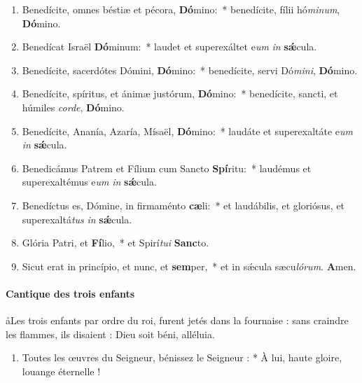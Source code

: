 \documentclass[twoside]{article}
\begin{document}
\begin{paracol}[1]{2}
\begin{enumerate}[wide, itemsep=0mm, labelwidth=!, labelindent=0pt, label=\color{gregoriocolor}\theenumi]
\item Benedícite, omnes béstiæ et pécora, \textbf{Dó}mino:~* benedícite, fílii hó\textit{mi}\textit{num}, \textbf{Dó}mino.

\item Benedícat Israël \textbf{Dó}minum:~* laudet et superexáltet e\textit{um} \textit{in} \textbf{sǽ}cula.

\item Benedícite, sacerdótes Dómini, \textbf{Dó}mino:~* benedícite, servi Dó\textit{mi}\textit{ni}, \textbf{Dó}mino.

\item Benedícite, spíritus, et ánimæ justórum, \textbf{Dó}mino:~* benedícite, sancti, et húmiles \textit{cor}\textit{de}, \textbf{Dó}mino.

\item Benedícite, Ananía, Azaría, Mísaël, \textbf{Dó}mino:~* laudáte et superexaltáte e\textit{um} \textit{in} \textbf{sǽ}cula.

\item Benedicámus Patrem et Fílium cum Sancto \textbf{Spí}ritu:~* laudémus et superexaltémus e\textit{um} \textit{in} \textbf{sǽ}cula.

\item Benedíctus es, Dómine, in firmaménto \textbf{cæ}li:~* et laudábilis, et gloriósus, et superexaltá\textit{tus} \textit{in} \textbf{sǽ}cula.

\item Glória Patri, et \textbf{Fí}lio,~* et Spirí\textit{tu}\textit{i} \textbf{Sanc}to.

\item Sicut erat in princípio, et nunc, et \textbf{sem}per,~* et in sǽcula sæcu\textit{ló}\textit{rum}. \textbf{A}men.
\end{enumerate}

\switchcolumn

\paragraph{Cantique des trois enfants}

\aa Les trois enfants par ordre du roi, furent jetés dans la fournaise : sans craindre les flammes, ils disaient : Dieu soit béni, alléluia.


\begin{enumerate}[wide, itemsep=0mm, labelwidth=!, labelindent=0pt, label=\color{gregoriocolor}\theenumi]
\item Toutes les œuvres du Seigneur,
   bénissez le Seigneur : *
À lui, haute gloire, louange éternelle !


\end{enumerate}
\end{paracol}
\end{document}
